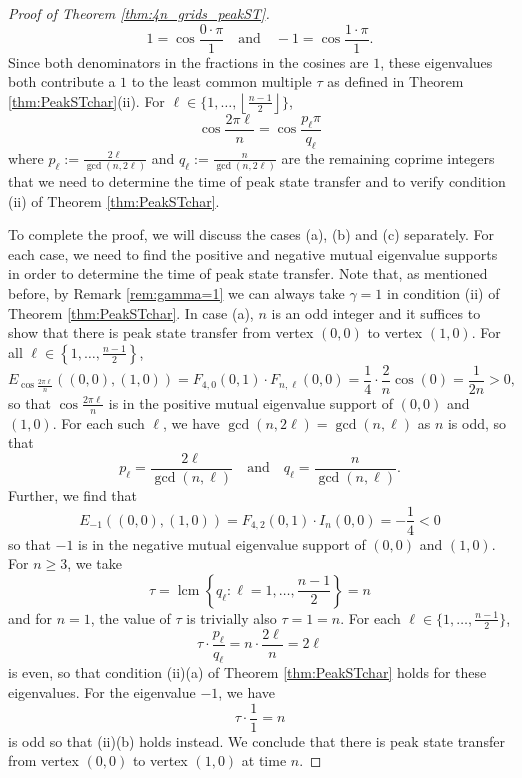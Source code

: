 \documentclass{article}
\numberwithin{equation}{section}
\DeclareMathOperator{\lcm}{lcm}
\begin{document}
\begin{proof}[Proof of Theorem \ref{thm:4n_grids_peakST}]
\[
1 = \cos\frac{0 \cdot \pi}{1} \quad \text{and} \quad -1 = \cos\frac{1 \cdot \pi}{1}.
\]
Since both denominators in the fractions in the cosines are $1$, these eigenvalues both contribute a $1$ to the least common multiple $\tau$ as defined in Theorem \ref{thm:PeakSTchar}(ii). For $\ell \in \{1,\ldots,\left\lfloor\frac{n-1}{2}\right\rfloor\}$,
\[
\cos \frac{2\pi \ell}{n} = \cos\frac{p_\ell\pi}{q_\ell}
\]
where $p_\ell := \frac{2\ell}{\gcd(n,2\ell)}$ and $q_\ell := \frac{n}{\gcd(n,2\ell)}$ are the remaining coprime integers that we need to determine the time of peak state transfer and to verify condition (ii) of Theorem \ref{thm:PeakSTchar}.

To complete the proof, we will discuss the cases (a), (b) and (c) separately. For each case, we need to find the positive and negative mutual eigenvalue supports in order to determine the time of peak state transfer. Note that, as mentioned before, by Remark \ref{rem:gamma=1} we can always take $\gamma = 1$ in condition (ii) of Theorem \ref{thm:PeakSTchar}.
In case (a), $n$ is an odd integer and it suffices to show that there is peak state transfer from vertex $(0,0)$ to vertex $(1,0)$. For all $\ell \in \left\{1,\ldots,\frac{n-1}{2}\right\}$,
\[
E_{\cos\frac{2\pi \ell}{n}}((0,0),(1,0)) = F_{4,0}(0,1)\cdot F_{n,\ell}(0,0) = \frac{1}{4}\cdot \frac{2}{n} \cos(0) = \frac{1}{2n} > 0,
\]
so that $\cos\frac{2\pi \ell}{n}$ is in the positive mutual eigenvalue support of $(0,0)$ and $(1,0)$. For each such $\ell$, we have $\gcd(n,2\ell) = \gcd(n,\ell)$ as $n$ is odd, so that
\[
p_\ell = \frac{2\ell}{\gcd(n,\ell)} \quad \text{and} \quad q_\ell = \frac{n}{\gcd(n,\ell)}.
\]
Further, we find that
\[
E_{-1}((0,0),(1,0)) = F_{4,2}(0,1) \cdot I_n(0,0) = -\frac{1}{4} < 0
\]
so that $-1$ is in the negative mutual eigenvalue support of $(0,0)$ and $(1,0)$. For $n \geq 3$, we take
\[
\tau = \lcm\left\{q_\ell : \ell = 1,\ldots,\frac{n-1}{2}\right\} = n
\]
and for $n = 1$, the value of $\tau$ is trivially also $\tau = 1 = n$. For each $\ell \in \{1,\ldots,\frac{n-1}{2}\}$,
\[
\tau \cdot \frac{p_\ell}{q_\ell} = n\cdot \frac{2\ell}{n} = 2\ell
\]
is even, so that condition (ii)(a) of Theorem \ref{thm:PeakSTchar} holds for these eigenvalues. For the eigenvalue $-1$, we have
\[
\tau \cdot \frac{1}{1} = n
\]
is odd so that (ii)(b) holds instead. We conclude that there is peak state transfer from vertex $(0,0)$ to vertex $(1,0)$ at time $n$.



\end{proof}
\end{document}
